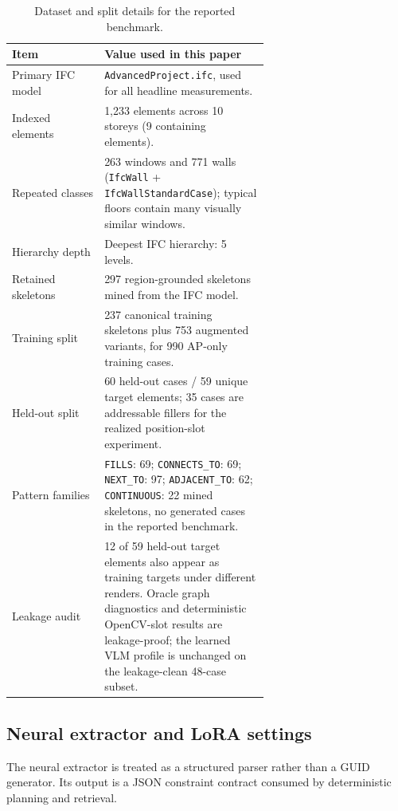 \begin{table}[ht]
  \centering
  \small
  \begin{tabular}{lp{0.64\linewidth}}
    \toprule
    Item & Value used in this paper \\
    \midrule
    Primary IFC model & \texttt{AdvancedProject.ifc}, used for all headline measurements. \\
    Indexed elements & 1,233 elements across 10 storeys (9 containing elements). \\
    Repeated classes & 263 windows and 771 walls (\texttt{IfcWall} + \texttt{IfcWallStandardCase}); typical floors contain many visually similar windows. \\
    Hierarchy depth & Deepest IFC hierarchy: 5 levels. \\
    Retained skeletons & 297 region-grounded skeletons mined from the IFC model. \\
    Training split & 237 canonical training skeletons plus 753 augmented variants, for 990 AP-only training cases. \\
    Held-out split & 60 held-out cases / 59 unique target elements; 35 cases are addressable fillers for the realized position-slot experiment. \\
    Pattern families & \texttt{FILLS}: 69; \texttt{CONNECTS\_TO}: 69; \texttt{NEXT\_TO}: 97; \texttt{ADJACENT\_TO}: 62; \texttt{CONTINUOUS}: 22 mined skeletons, no generated cases in the reported benchmark. \\
    Leakage audit & 12 of 59 held-out target elements also appear as training targets under different renders. Oracle graph diagnostics and deterministic OpenCV-slot results are leakage-proof; the learned VLM profile is unchanged on the leakage-clean 48-case subset. \\
    \bottomrule
  \end{tabular}
  \caption{Dataset and split details for the reported benchmark.}
  \label{tab:app-data}
\end{table}

\subsection{Neural extractor and LoRA settings}
\label{app:lora}

The neural extractor is treated as a structured parser rather than a GUID generator. Its output is a JSON constraint contract consumed by deterministic planning and retrieval.

